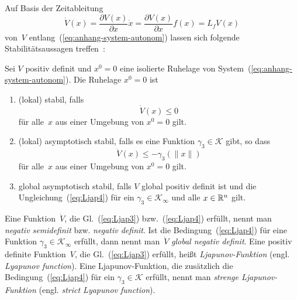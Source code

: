Auf Basis der Zeitableitung 
\[
\dot{V}(x)=\frac{\partial V(x)}{\partial x}\dot{x}=\frac{\partial V(x)}{\partial x}f(x)=L_{f}V(x)
\]
von~$V$ entlang~(\ref{eq:anhang-system-autonom}) lassen sich folgende
Stabilitätsaussagen treffen~\cite{hahn1967}:
\begin{theorem}
\label{thm:Lyapunov-Theorem}Sei $V$ positiv definit und $x^{0}=0$
eine isolierte Ruhelage von System~(\ref{eq:anhang-system-autonom}).
Die Ruhelage $x^{0}=0$ ist
\begin{enumerate}
\item (lokal) stabil, falls 
\begin{equation}
\dot{V}(x)\leq0\label{eq:Ljap3}
\end{equation}
für alle~$x$ aus einer Umgebung von $x^{0}=0$ gilt.
\item (lokal) asymptotisch stabil, falls es eine Funktion $\gamma_{3}\in\mathcal{K}$
gibt, so dass 
\begin{equation}
\dot{V}(x)\leq-\gamma_{3}\left(\|x\|\right)\label{eq:Ljap4}
\end{equation}
für alle~$x$ aus einer Umgebung von $x^{0}=0$ gilt.
\item global asymptotisch stabil, falls $V$ global positiv definit ist
und die Ungleichung~(\ref{eq:Ljap4}) für ein $\gamma_{3}\in\mathcal{K}_{\infty}$
und alle $x\in{\mathbb{R}}^{n}$ gilt.
\end{enumerate}
\end{theorem}

Eine Funktion~$\dot{V}$, die Gl.~(\ref{eq:Ljap3}) bzw.~(\ref{eq:Ljap4})
erfüllt, nennt man \emph{negativ semi\-definit} bzw. \emph{negativ
definit}. Ist die Bedingung~(\ref{eq:Ljap4})
für eine Funktion $\gamma_{3}\in\mathcal{K}_{\infty}$ erfüllt, dann
nennt man~$\dot{V}$ \emph{global negativ definit}. Eine positiv
definite Funktion~$V$, die Gl.~(\ref{eq:Ljap3}) erfüllt, heißt
\emph{Ljapunov-Funktion}
(engl. \emph{Lyapunov function}). Eine Ljapunov-Funktion, die zusätzlich
die Bedingung~(\ref{eq:Ljap4}) für ein $\gamma_{3}\in\mathcal{K}$
erfüllt, nennt man \emph{strenge Ljapunov-Funktion} (engl. \emph{strict
Lyapunov function}). 

\medskip{}

